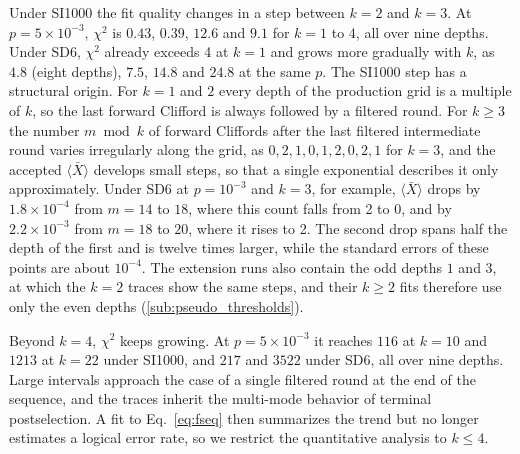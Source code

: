 Under SI1000 the fit quality changes in a step between $k = 2$ and $k = 3$. At $p = 5\times10^{-3}$, $\chi^2$ is $0.43$, $0.39$, $12.6$ and $9.1$ for $k = 1$ to $4$, all over nine depths. Under SD6, $\chi^2$ already exceeds 4 at $k = 1$ and grows more gradually with $k$, as $4.8$ (eight depths), $7.5$, $14.8$ and $24.8$ at the same $p$. The SI1000 step has a structural origin. For $k = 1$ and $2$ every depth of the production grid is a multiple of $k$, so the last forward Clifford is always followed by a filtered round. For $k \ge 3$ the number $m \bmod k$ of forward Cliffords after the last filtered intermediate round varies irregularly along the grid, as $0, 2, 1, 0, 1, 2, 0, 2, 1$ for $k = 3$, and the accepted $\langle \bar{X} \rangle$ develops small steps, so that a single exponential describes it only approximately. Under SD6 at $p = 10^{-3}$ and $k = 3$, for example, $\langle \bar{X} \rangle$ drops by $1.8\times10^{-4}$ from $m = 14$ to $18$, where this count falls from 2 to 0, and by $2.2\times10^{-3}$ from $m = 18$ to $20$, where it rises to 2. The second drop spans half the depth of the first and is twelve times larger, while the standard errors of these points are about $10^{-4}$. The extension runs also contain the odd depths $1$ and $3$, at which the $k = 2$ traces show the same steps, and their $k \ge 2$ fits therefore use only the even depths (\autoref{sub:pseudo_thresholds}).

Beyond $k = 4$, $\chi^2$ keeps growing. At $p = 5\times10^{-3}$ it reaches $116$ at $k = 10$ and $1213$ at $k = 22$ under SI1000, and $217$ and $3522$ under SD6, all over nine depths. Large intervals approach the case of a single filtered round at the end of the sequence, and the traces inherit the multi-mode behavior of terminal postselection. A fit to Eq.~\eqref{eq:fseq} then summarizes the trend but no longer estimates a logical error rate, so we restrict the quantitative analysis to $k \le 4$.

